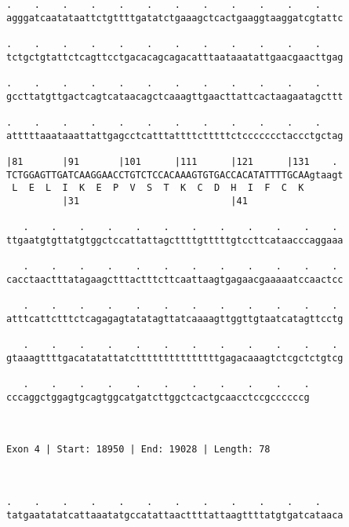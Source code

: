 \documentclass{article}
\begin{document}
\begin{Verbatim}
.    .    .    .    .    .    .    .    .    .    .    .    
agggatcaatataattctgttttgatatctgaaagctcactgaaggtaaggatcgtattc
                                                            
.    .    .    .    .    .    .    .    .    .    .    .    
tctgctgtattctcagttcctgacacagcagacatttaataaatattgaacgaacttgag
                                                            
.    .    .    .    .    .    .    .    .    .    .    .    
gccttatgttgactcagtcataacagctcaaagttgaacttattcactaagaatagcttt
                                                            
.    .    .    .    .    .    .    .    .    .    .    .    
atttttaaataaattattgagcctcatttattttctttttctccccccctaccctgctag
                                                            
|81       |91       |101      |111      |121      |131    . 
TCTGGAGTTGATCAAGGAACCTGTCTCCACAAAGTGTGACCACATATTTTGCAAgtaagt
 L  E  L  I  K  E  P  V  S  T  K  C  D  H  I  F  C  K       
          |31                           |41                 
  
   .    .    .    .    .    .    .    .    .    .    .    . 
ttgaatgtgttatgtggctccattattagcttttgtttttgtccttcataacccaggaaa
                                                            
   .    .    .    .    .    .    .    .    .    .    .    . 
cacctaactttatagaagctttactttcttcaattaagtgagaacgaaaaatccaactcc
                                                            
   .    .    .    .    .    .    .    .    .    .    .    . 
atttcattctttctcagagagtatatagttatcaaaagttggttgtaatcatagttcctg
                                                            
   .    .    .    .    .    .    .    .    .    .    .    . 
gtaaagttttgacatatattatctttttttttttttttgagacaaagtctcgctctgtcg
                                                            
   .    .    .    .    .    .    .    .    .    .    .
cccaggctggagtgcagtggcatgatcttggctcactgcaacctccgccccccg
                                                      
                                                      
 
Exon 4 | Start: 18950 | End: 19028 | Length: 78



.    .    .    .    .    .    .    .    .    .    .    .    
tatgaatatatcattaaatatgccatattaacttttattaagttttatgtgatcataaca
                                                            

\end{Verbatim}
\end{document}

